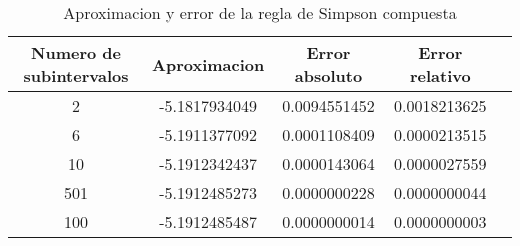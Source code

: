 \begin{table}[h]
\begin{center}
\begin{tabular}{|c|c|c|c|c|} \hline 
\textbf{Numero de subintervalos} & \textbf{Aproximacion} & \textbf{Error absoluto} & \textbf{Error relativo}\\ 
\hline
2 & -5.1817934049 & 0.0094551452 & 0.0018213625
\\
\hline
6 & -5.1911377092 & 0.0001108409 & 0.0000213515
\\
\hline
10 & -5.1912342437 & 0.0000143064 & 0.0000027559
\\
\hline
501 & -5.1912485273 & 0.0000000228 & 0.0000000044
\\
\hline
100 & -5.1912485487 & 0.0000000014 & 0.0000000003
\\
\hline
\end{tabular}
\end{center}
\caption{Aproximacion y error de la regla de Simpson compuesta}
\label{tab:2}
\end{table}

